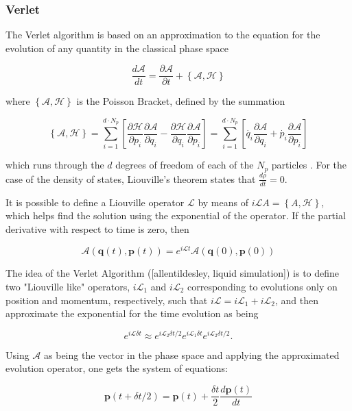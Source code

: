 \subsubsection{Verlet}

The Verlet algorithm is based on an approximation to the equation for the evolution of any quantity in the classical phase space

$$\frac{d \mathcal{A}}{dt} = \frac{\partial \mathcal{A}}{\partial t} + \left\{\mathcal{A}, \mathcal{H} \right\}$$

where $\left\{\mathcal{A}, \mathcal{H} \right\}$ is the Poisson Bracket, defined by the summation

$$\left\{\mathcal{A}, \mathcal{H} \right\} = \sum_{i=1}^{d\cdot N_p} \left[ \frac{\partial \mathcal{H}}{\partial p_i}\frac{\partial \mathcal{A}}{\partial q_i} - \frac{\partial \mathcal{H}}{\partial q_i}\frac{\partial \mathcal{A}}{\partial p_i}\right] = \sum_{i=1}^{d\cdot N_p} \left[ \Dot{q_i} \frac{\partial \mathcal{A}}{\partial q_i} + \Dot{p_i}\frac{\partial \mathcal{A}}{\partial p_i}\right]$$

which runs through the $d$ degrees of freedom of each of the $N_p$ particles \cite{salinasIntroducaoFisica2013}. For the case of the density of states, Liouville's theorem states that $\frac{d \rho}{dt} = 0$.

It is possible to define a Liouville operator $\mathcal{L}$ by means of $i\mathcal{L}A = \left\{A,\mathcal{H}\right\}$, which helps find the solution using the exponential of the operator. If the partial derivative with respect to time is zero, then

$$\mathcal{A}(\mathbf{q}(t), \mathbf{p}(t)) = e^{i\mathcal{L}t} \mathcal{A}(\mathbf{q}(0), \mathbf{p}(0))$$

The idea of the Verlet Algorithm ([allentildesley, liquid simulation]) is to define two "Liouville like" operators, $i\mathcal{L}_1$ and $i\mathcal{L}_2$ corresponding to evolutions only on position and momentum, respectively, such that $i\mathcal{L} = i\mathcal{L}_1 + i\mathcal{L}_2$, and then approximate the exponential for the time evolution as being

$$e^{i\mathcal{L}\delta t} \approx e^{i\mathcal{L}_2\delta t/2}e^{i\mathcal{L}_1\delta t}e^{i\mathcal{L}_2\delta t/2} .$$

Using $\mathcal{A}$ as being the vector in the phase space and applying the approximated evolution operator, one gets the system of equations:

$$\mathbf{p}(t+\delta t/2) = \mathbf{p}(t) + \frac{\delta t}{2}\frac{d \mathbf{p}(t)}{dt}$$

